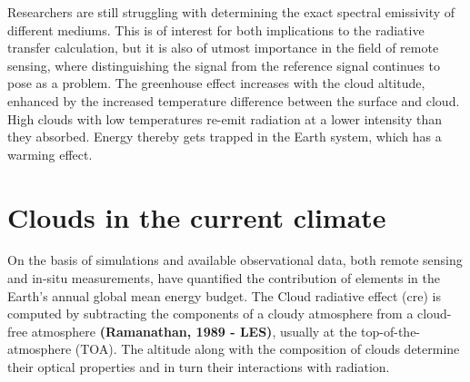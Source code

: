 Researchers are still struggling with determining the exact spectral emissivity of different mediums. This is of interest for both implications to the radiative transfer calculation, but it is also of utmost importance in the field of remote sensing, where distinguishing the signal from the reference signal continues to pose as a problem.
The greenhouse effect increases with the cloud altitude, enhanced by the increased temperature difference between the surface and cloud. High clouds with low temperatures re-emit radiation at a lower intensity than they absorbed. Energy thereby gets trapped in the Earth system, which has a warming effect. 
\section{Clouds in the current climate} \label{sec:intro_cloud_current_climate}
On the basis of simulations and available observational data, both remote sensing and in-situ measurements,  have quantified the contribution of elements in the Earth's annual global mean energy budget. The Cloud radiative effect (\acrshort{cre}) is computed by subtracting the components of a cloudy atmosphere from a cloud-free atmosphere \textbf{(Ramanathan, 1989 - LES)}, usually at the top-of-the-atmosphere (TOA). The altitude along with the composition of clouds determine their optical properties and in turn their interactions with radiation.

